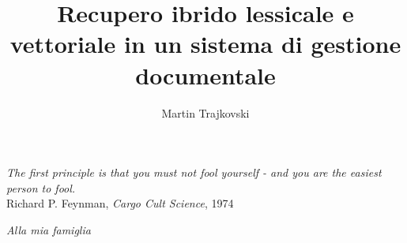 \documentclass{theme/uniprthesis}
\title{Recupero ibrido lessicale e vettoriale in un sistema di gestione documentale}
\author{Martin Trajkovski}
\newcommand\blankpage{
    \null
    \thispagestyle{empty}
    \addtocounter{page}{-1}
    \newpage
}
\begin{document}
\maketitle
\blankpage

\newpage
\thispagestyle{empty}
\null{}
\begin{flushright}
	\textit{The first principle is that you must not fool yourself - and you are the easiest person to fool.}\\[1em]
	Richard P. Feynman, \textit{Cargo Cult Science}, 1974
\end{flushright}
\null
\newpage
\blankpage

\newpage
\thispagestyle{empty}
\null{}
\begin{flushright}
	\textit{Alla mia famiglia}
\end{flushright}
\null
\newpage
\blankpage

\tableofcontents
\listoffigures



\pagestyle{fancy}








\pagestyle{plain}


\appendix





\pagestyle{plain}



\newpage
\thispagestyle{empty}
\null{}
\null
\newpage

\blankpage
\end{document}
